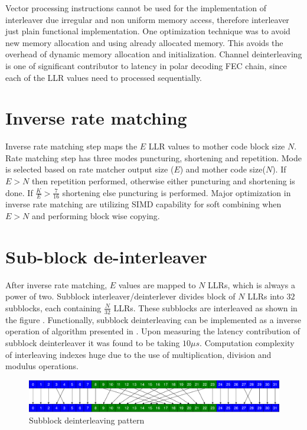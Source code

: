 Vector processing instructions cannot be used for the implementation of interleaver due irregular and non uniform memory access, therefore interleaver just plain functional implementation. One optimization technique was to avoid new memory allocation and using already allocated memory. This avoids the overhead of dynamic memory allocation and initialization. Channel deinterleaving is one of significant contributor to latency in polar decoding FEC chain, since each of the LLR values need to processed sequentially.

\section{Inverse rate matching}
Inverse rate matching step maps the $E$ LLR values to mother code block size $ N $. Rate matching step has three modes puncturing, shortening and repetition. Mode is selected based on rate matcher output size ($E$) and mother code size($ N $). If $E > N$ then repetition performed, otherwise either puncturing and shortening is done. If $ \frac{K}{E} > \frac{7}{16} $ shortening else puncturing is performed. Major optimization in inverse rate matching are utilizing SIMD capability for soft combining when $ E>N $ and performing block wise copying. 
%
%
\section{Sub-block de-interleaver}
After inverse rate matching, $E$ values are mapped to $N$ LLRs, which is always a power of two. Subblock interleaver/deinterlever divides block of $N$ LLRs into $32$ subblocks, each containing $\frac{N}{32}$ LLRs. These subblocks are interleaved as shown in the figure . Functionally, subblock deinterleaving can be implemented as a inverse operation of algorithm presented in \cite{3gpp.38.212}. Upon measuring the latency contribution of subblock deinterleaver it was found to be taking $10 \mu s$. Computation complexity of interleaving indexes huge due to the use of multiplication, division and modulus operations. \newline


\begin{figure}[]
	\centering
	\includegraphics[width=1.0\textwidth]{./figures/subblockDeinterleaver.pdf}
	\caption{Subblock deinterleaving pattern}
	\label{fig:subblockDeinterleaver}
\end{figure}


